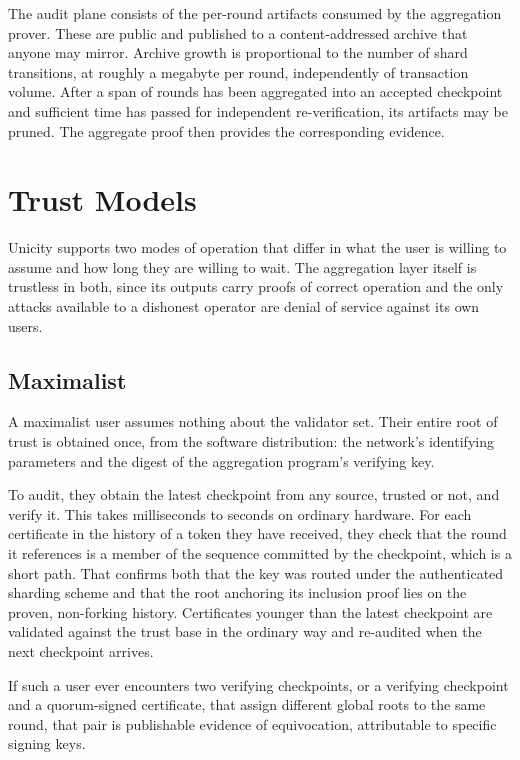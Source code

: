 The audit plane consists of the per-round artifacts consumed by the aggregation prover. These are public and published to a content-addressed archive that anyone may mirror. Archive growth is proportional to the number of shard transitions, at roughly a megabyte per round, independently of transaction volume. After a span of rounds has been aggregated into an accepted checkpoint and sufficient time has passed for independent re-verification, its artifacts may be pruned. The aggregate proof then provides the corresponding evidence.

\section{Trust Models}\label{sec:trust-models}

Unicity supports two modes of operation that differ in what the user is willing to assume and how long they are willing to wait. The aggregation layer itself is trustless in both, since its outputs carry proofs of correct operation and the only attacks available to a dishonest operator are denial of service against its own users.

\subsection{Maximalist}

A maximalist user assumes nothing about the validator set. Their entire root of trust is obtained once, from the software distribution: the network's identifying parameters and the digest of the aggregation program's verifying key.

To audit, they obtain the latest checkpoint from any source, trusted or not, and verify it. This takes milliseconds to seconds on ordinary hardware. For each certificate in the history of a token they have received, they check that the round it references is a member of the sequence committed by the checkpoint, which is a short path. That confirms both that the key was routed under the authenticated sharding scheme and that the root anchoring its inclusion proof lies on the proven, non-forking history. Certificates younger than the latest checkpoint are validated against the trust base in the ordinary way and re-audited when the next checkpoint arrives.

If such a user ever encounters two verifying checkpoints, or a verifying checkpoint and a quorum-signed certificate, that assign different global roots to the same round, that pair is publishable evidence of equivocation, attributable to specific signing keys.

